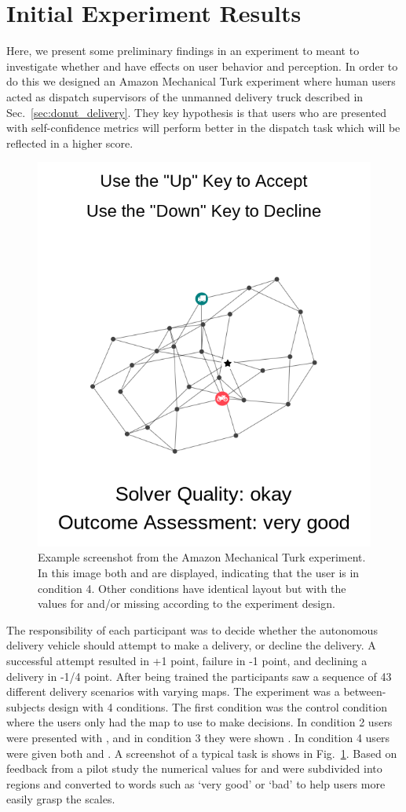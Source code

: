 \section{Initial Experiment Results} \label{sec:exp_results}
Here, we present some preliminary findings in an experiment to meant to investigate whether \xQ{} and \xO{} have effects on user behavior and perception. In order to do this we designed an Amazon Mechanical Turk experiment where human users acted as dispatch supervisors of the unmanned delivery truck described in Sec.~\ref{sec:donut_delivery}. They key hypothesis is that users who are presented with self-confidence metrics will perform better in the dispatch task which will be reflected in a higher score.

\begin{figure}[tbp]
    \centering
    \includegraphics[width=0.5\linewidth]{Figures/experiment_screenshot.png}
    \caption{Example screenshot from the Amazon Mechanical Turk experiment. In this image both \xQ{} and \xP{} are displayed, indicating that the user is in condition 4. Other conditions have identical layout but with the values for \xQ{} and/or \xP{} missing according to the experiment design.} 
    \label{fig:experiment_screenshot}
\end{figure}

The responsibility of each participant was to decide whether the autonomous delivery vehicle should attempt to make a delivery, or decline the delivery. A successful attempt resulted in +1 point, failure in -1 point, and declining a delivery in -1/4 point. After being trained the participants saw a sequence of 43 different delivery scenarios with varying maps. The experiment was a between-subjects design with 4 conditions. The first condition was the control condition where the users only had the map to use to make decisions. In condition 2 users were presented with \xQ{}, and in condition 3 they were shown \xP{}. In condition 4 users were given both \xQ{} and \xP. A screenshot of a typical task is shows in Fig.~\ref{fig:experiment_screenshot}. Based on feedback from a pilot study the numerical values for \xQ{} and \xP{} were subdivided into regions and converted to words such as `very good' or `bad' to help users more easily grasp the scales.

